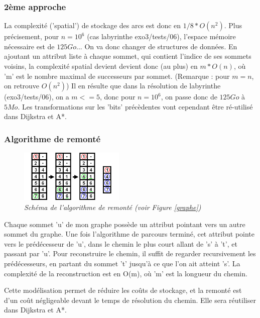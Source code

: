 \documentclass[10pt]{article}
\begin{document}
			\subsubsection{2ème approche}
				La complexité ('spatial') de stockage des arcs est donc en \(1/8*O(n^2)\).
				Plus précisement, pour \(n=10^6\) (cas labyrinthe exo3/tests/06),
				l'espace mémoire nécessaire est de \(125Go\)... On va donc changer de structures de données.
				En ajoutant un attribut liste à chaque sommet, qui contient l'indice de ses sommets voisins,
				la complexité spatial devient devient donc (au plus) en \(m * O(n)\), où 'm' est
				le nombre maximal de successeurs par sommet. (Remarque : pour \(m = n\), on retrouve \(O(n^2)\))
				Il en résulte que dans la résolution de labyrinthe (exo3/tests/06), on a \(m <= 5\), donc pour \(n=10^6\),
				on passe donc de \(125Go\) à \(5 Mo\). Les transformations sur les 'bits' précèdentes vont cependant être ré-utilisé
				dans Dijkstra et A*.
				
			\subsubsection{Algorithme de remonté}

				\begin{figure}
					\includegraphics[width=5cm]{./images/remonte.png}
					\caption{\textit{Schéma de l'algorithme de remonté (voir Figure \ref{graphe})}}
				\end{figure}

				Chaque sommet 'u' de mon graphe possède un attribut pointant vers un autre sommet du graphe.
				Une fois l'algorithme de parcours terminé, cet attribut pointe vers le prédécesseur de 'u',
				dans le chemin le plus court allant de 's' à 't', et passant par 'u'.
				Pour reconstruire le chemin, il suffit de regarder recursivement les prédécesseurs, en partant du sommet
				't' jusqu'à ce que l'on ait atteint 's'.
				La complexité de la reconstruction est en O(m), où 'm' est la longueur du chemin.\newline
				
				Cette modélisation permet de réduire les coûts de stockage, et la remonté est d'un coût
				négligeable devant le temps de résolution du chemin. Elle sera réutiliser dans Dijkstra et A*.
			
\end{document}
